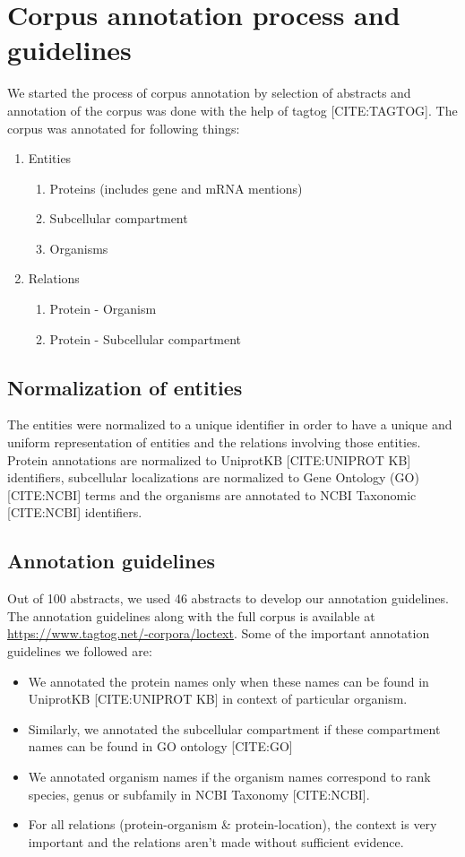 \section{Corpus annotation process and guidelines}

We started the process of corpus annotation by selection of abstracts and annotation of the corpus was done with the help of tagtog [CITE:TAGTOG]. The corpus was annotated for following things:

\begin{enumerate}
\item Entities
\begin{enumerate}
\item Proteins (includes gene and mRNA mentions)
\item Subcellular compartment
\item Organisms
\end{enumerate}
\item Relations
\begin{enumerate}
\item Protein - Organism
\item Protein - Subcellular compartment
\end{enumerate}
\end{enumerate}

\subsection*{Normalization of entities}

The entities were normalized to a unique identifier in order to have a unique and uniform representation of entities and the relations involving those entities. Protein annotations are normalized to UniprotKB [CITE:UNIPROT KB] identifiers, subcellular localizations are normalized to Gene Ontology (GO) [CITE:NCBI] terms and the organisms are annotated to NCBI Taxonomic [CITE:NCBI] identifiers.

\subsection*{Annotation guidelines}
Out of 100 abstracts, we used 46 abstracts to develop our annotation guidelines. The annotation guidelines along with the full corpus is available at \hyperref[LocText]{https://www.tagtog.net/-corpora/loctext}. Some of the important annotation guidelines we followed are:

\begin{itemize}
\item We annotated the protein names only when these names can be found in UniprotKB [CITE:UNIPROT KB] in context of particular organism.
\item Similarly, we annotated the subcellular compartment if these compartment names can be found in GO ontology [CITE:GO]
\item We annotated organism names if the organism names correspond to rank species, genus or subfamily in NCBI Taxonomy [CITE:NCBI].
\item For all relations (protein-organism \& protein-location), the context is very important and the relations aren't made without sufficient evidence.
\end{itemize}


